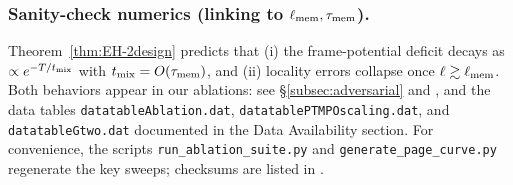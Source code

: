 \documentclass[11pt,a4paper]{article}
\theoremstyle{plain}
\theoremstyle{definition}
\theoremstyle{remark}
\begin{document}
\subsubsection{Sanity-check numerics (linking to $\ell_{\rm mem},\tau_{\rm mem}$).}
Theorem~\ref{thm:EH-2design} predicts that (i) the frame-potential deficit decays as $\propto e^{-T/t_{\rm mix}}$ with $t_{\rm mix}=O(\tau_{\rm mem})$, and (ii) locality errors collapse once $\ell\gtrsim\ell_{\rm mem}$.
Both behaviors appear in our ablations: see \S\ref{subsec:adversarial} and , and the data tables
\texttt{datatableAblation.dat}, \texttt{datatablePTMPOscaling.dat}, and \texttt{datatableGtwo.dat} documented in the Data Availability section.
For convenience, the scripts \texttt{run\_ablation\_suite.py} and \texttt{generate\_page\_curve.py} regenerate the key sweeps;
checksums are listed in .
\end{document}
